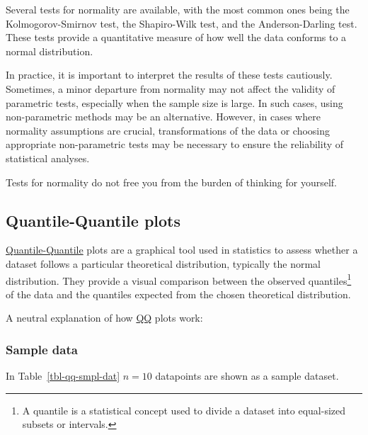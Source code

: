 \documentclass[
  a4paper,
]{scrbook}
\begin{document}
Several tests for normality are available, with the most common ones
being the Kolmogorov-Smirnov test, the Shapiro-Wilk test, and the
Anderson-Darling test. These tests provide a quantitative measure of how
well the data conforms to a normal distribution.

In practice, it is important to interpret the results of these tests
cautiously. Sometimes, a minor departure from normality may not affect
the validity of parametric tests, especially when the sample size is
large. In such cases, using non-parametric methods may be an
alternative. However, in cases where normality assumptions are crucial,
transformations of the data or choosing appropriate non-parametric tests
may be necessary to ensure the reliability of statistical analyses.

Tests for normality do not free you from the burden of thinking for
yourself.

\subsection{Quantile-Quantile plots}\label{sec-qq-plot}

\hyperref[qq]{Quantile-Quantile} plots are a graphical tool used in
statistics to assess whether a dataset follows a particular theoretical
distribution, typically the normal distribution. They provide a visual
comparison between the observed quantiles\footnote{A quantile is a
  statistical concept used to divide a dataset into equal-sized subsets
  or intervals.} of the data and the quantiles expected from the chosen
theoretical distribution.

A neutral explanation of how \hyperref[qq]{QQ} plots work:

\subsubsection{Sample data}\label{sample-data}

In Table~\ref{tbl-qq-smpl-dat} \(n=10\) datapoints are shown as a sample
dataset.
\end{document}
